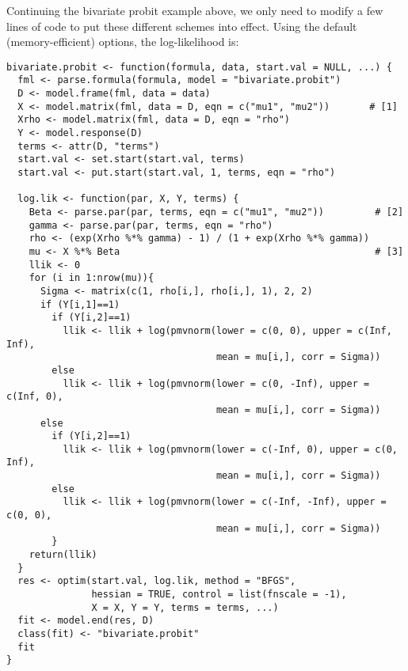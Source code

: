 Continuing the bivariate probit example above, we only need to modify
a few lines of code to put these different schemes into effect.  Using the
default (memory-efficient) options, the log-likelihood is: 
\begin{verbatim}
bivariate.probit <- function(formula, data, start.val = NULL, ...) {
  fml <- parse.formula(formula, model = "bivariate.probit")
  D <- model.frame(fml, data = data)
  X <- model.matrix(fml, data = D, eqn = c("mu1", "mu2"))       # [1]
  Xrho <- model.matrix(fml, data = D, eqn = "rho")
  Y <- model.response(D)
  terms <- attr(D, "terms")
  start.val <- set.start(start.val, terms)
  start.val <- put.start(start.val, 1, terms, eqn = "rho")

  log.lik <- function(par, X, Y, terms) {
    Beta <- parse.par(par, terms, eqn = c("mu1", "mu2"))         # [2]
    gamma <- parse.par(par, terms, eqn = "rho")
    rho <- (exp(Xrho %*% gamma) - 1) / (1 + exp(Xrho %*% gamma))
    mu <- X %*% Beta                                             # [3]
    llik <- 0
    for (i in 1:nrow(mu)){
      Sigma <- matrix(c(1, rho[i,], rho[i,], 1), 2, 2)
      if (Y[i,1]==1)
        if (Y[i,2]==1)
          llik <- llik + log(pmvnorm(lower = c(0, 0), upper = c(Inf, Inf), 
                                     mean = mu[i,], corr = Sigma))
        else
          llik <- llik + log(pmvnorm(lower = c(0, -Inf), upper = c(Inf, 0), 
                                     mean = mu[i,], corr = Sigma))
      else
        if (Y[i,2]==1)
          llik <- llik + log(pmvnorm(lower = c(-Inf, 0), upper = c(0, Inf),
                                     mean = mu[i,], corr = Sigma))
        else
          llik <- llik + log(pmvnorm(lower = c(-Inf, -Inf), upper = c(0, 0), 
                                     mean = mu[i,], corr = Sigma))
        }
    return(llik)
  }
  res <- optim(start.val, log.lik, method = "BFGS",
               hessian = TRUE, control = list(fnscale = -1),
               X = X, Y = Y, terms = terms, ...)
  fit <- model.end(res, D)
  class(fit) <- "bivariate.probit"
  fit
}
\end{verbatim}  

